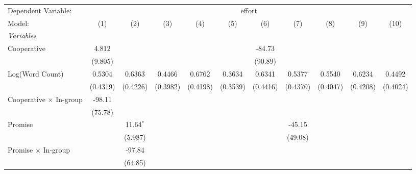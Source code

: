 
\begingroup
\centering
\begin{tabular}{lcccccccccc}
   \tabularnewline \midrule \midrule
   Dependent Variable: & \multicolumn{10}{c}{effort}\\
   Model:                                     & (1)      & (2)         & (3)          & (4)      & (5)           & (6)      & (7)      & (8)           & (9)      & (10)\\  
   \midrule
   \emph{Variables}\\
   Cooperative                                & 4.812    &             &              &          &               & -84.73   &          &               &          &   \\   
                                              & (9.805)  &             &              &          &               & (90.89)  &          &               &          &   \\   
   Log(Word Count)                            & 0.5304   & 0.6363      & 0.4466       & 0.6762   & 0.3634        & 0.6341   & 0.5377   & 0.5540        & 0.6234   & 0.4492\\   
                                              & (0.4319) & (0.4226)    & (0.3982)     & (0.4198) & (0.3539)      & (0.4416) & (0.4370) & (0.4047)      & (0.4208) & (0.4024)\\   
   Cooperative $\times$ In-group              & -98.11   &             &              &          &               &          &          &               &          &   \\   
                                              & (75.78)  &             &              &          &               &          &          &               &          &   \\   
   Promise                                    &          & 11.64$^{*}$ &              &          &               &          & -45.15   &               &          &   \\   
                                              &          & (5.987)     &              &          &               &          & (49.08)  &               &          &   \\   
   Promise $\times$ In-group                  &          & -97.84      &              &          &               &          &          &               &          &   \\   
                                              &          & (64.85)     &              &          &               &          &          &               &          &   \\   

\end{tabular}
